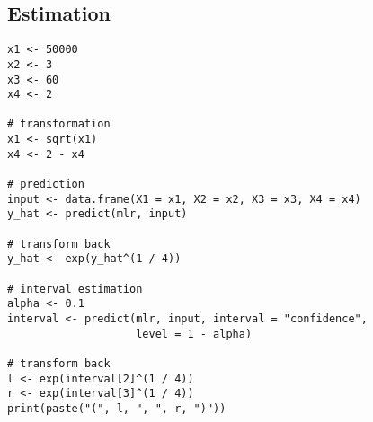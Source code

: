 \subsection{Estimation}\label{appendix:prediction}

\begin{lstlisting}
x1 <- 50000
x2 <- 3
x3 <- 60
x4 <- 2

# transformation
x1 <- sqrt(x1)
x4 <- 2 - x4

# prediction
input <- data.frame(X1 = x1, X2 = x2, X3 = x3, X4 = x4)
y_hat <- predict(mlr, input)

# transform back
y_hat <- exp(y_hat^(1 / 4))

# interval estimation
alpha <- 0.1
interval <- predict(mlr, input, interval = "confidence", 
                    level = 1 - alpha)

# transform back
l <- exp(interval[2]^(1 / 4))
r <- exp(interval[3]^(1 / 4))
print(paste("(", l, ", ", r, ")"))
\end{lstlisting}

